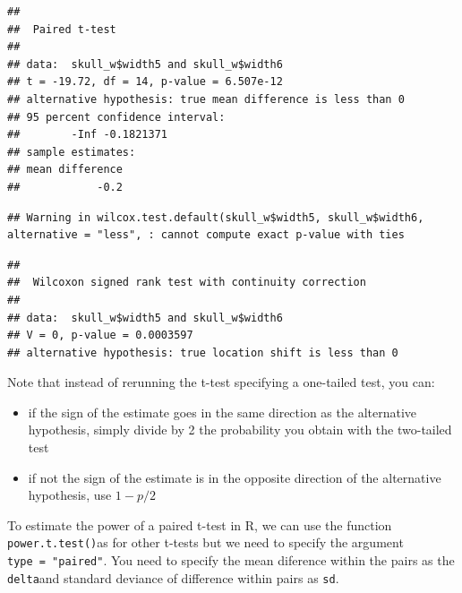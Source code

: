 \documentclass[
  12pt,
]{book}
\makeatletter
\newenvironment{Shaded}{\begin{snugshade}}{\end{snugshade}}
\newcommand{\DataTypeTok}[1]{\textcolor[rgb]{0.13,0.29,0.53}{#1}}
\newcommand{\KeywordTok}[1]{\textcolor[rgb]{0.13,0.29,0.53}{\textbf{#1}}}
\newcommand{\NormalTok}[1]{#1}
\newcommand{\OperatorTok}[1]{\textcolor[rgb]{0.81,0.36,0.00}{\textbf{#1}}}
\newcommand{\OtherTok}[1]{\textcolor[rgb]{0.56,0.35,0.01}{#1}}
\newcommand{\StringTok}[1]{\textcolor[rgb]{0.31,0.60,0.02}{#1}}
\providecommand{\tightlist}{%
  \setlength{\itemsep}{0pt}\setlength{\parskip}{0pt}}
\newenvironment{kframe}{%
\medskip{}
\setlength{\fboxsep}{.8em}
\def\at@end@of@kframe{}%
\ifinner\ifhmode%
 \def\at@end@of@kframe{\end{minipage}}%
 \begin{minipage}{\columnwidth}%
\fi\fi%
\def\FrameCommand##1{\hskip\@totalleftmargin \hskip-\fboxsep
\colorbox{incolor}{##1}\hskip-\fboxsep
    \hskip-\linewidth \hskip-\@totalleftmargin \hskip\columnwidth}%
\MakeFramed {\advance\hsize-\width
  \@totalleftmargin\z@ \linewidth\hsize
  \@setminipage}}%
{\par\unskip\endMakeFramed%
\at@end@of@kframe}
\newenvironment{rmdblock}[1]
 {
 \begin{itemize}
 \renewcommand{\labelitemi}{
   \raisebox{-.7\height}[0pt][0pt]{
     {\setkeys{Gin}{width=3em,keepaspectratio}\texttt{[image: images/\#1]}}
   }
 }
 \begin{kframe}
 \setlength{\fboxsep}{1em}
 \item
 }
 {
 \end{kframe}
 \end{itemize}
 }
\newenvironment{rmdwarning}
  {\begin{rmdblock}{warning}}
  {\end{rmdblock}}
\makeatother
\begin{document}
\begin{verbatim}
## 
##  Paired t-test
## 
## data:  skull_w$width5 and skull_w$width6
## t = -19.72, df = 14, p-value = 6.507e-12
## alternative hypothesis: true mean difference is less than 0
## 95 percent confidence interval:
##        -Inf -0.1821371
## sample estimates:
## mean difference 
##            -0.2
\end{verbatim}

\begin{Shaded}
\end{Shaded}

\begin{verbatim}
## Warning in wilcox.test.default(skull_w$width5, skull_w$width6, alternative = "less", : cannot compute exact p-value with ties
\end{verbatim}

\begin{verbatim}
## 
##  Wilcoxon signed rank test with continuity correction
## 
## data:  skull_w$width5 and skull_w$width6
## V = 0, p-value = 0.0003597
## alternative hypothesis: true location shift is less than 0
\end{verbatim}

\begin{rmdwarning}
Note that instead of rerunning the t-test specifying a one-tailed test, you can:

\begin{itemize}
\tightlist
\item
  if the sign of the estimate goes in the same direction as the alternative hypothesis, simply divide by 2 the probability you obtain with the two-tailed test
\item
  if not the sign of the estimate is in the opposite direction of the alternative hypothesis, use \(1 - p/2\)
\end{itemize}
\end{rmdwarning}

To estimate the power of a paired t-test in R, we can use the function \texttt{power.t.test()}as for other t-tests but we need to specify the argument \texttt{type\ =\ "paired"}.
You need to specify the mean diference within the pairs as the \texttt{delta}and standard deviance of difference within pairs as \texttt{sd}.
\end{document}
